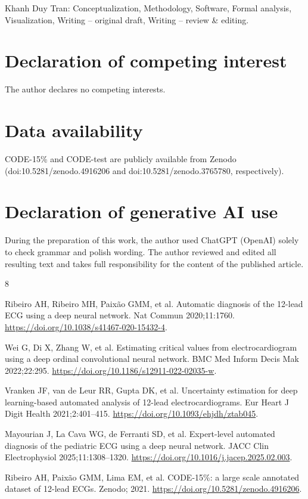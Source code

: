\documentclass[5p,times,twocolumn]{elsarticle}
\begin{document}
Khanh Duy Tran: Conceptualization, Methodology, Software, Formal analysis,
Visualization, Writing -- original draft, Writing -- review \& editing.

\section*{Declaration of competing interest}

The author declares no competing interests.

\section*{Data availability}

CODE-15\% and CODE-test are publicly available from Zenodo
(doi:10.5281/zenodo.4916206 and doi:10.5281/zenodo.3765780, respectively).

\section*{Declaration of generative AI use}

During the preparation of this work, the author used ChatGPT (OpenAI) 
solely to check grammar and polish wording. The author reviewed and 
edited all resulting text and takes full responsibility for the content of the published article.

\begin{thebibliography}{8}

Ribeiro AH, Ribeiro MH, Paix\~ao GMM, et al. Automatic diagnosis of the 12-lead
ECG using a deep neural network. Nat Commun 2020;11:1760.
\url{https://doi.org/10.1038/s41467-020-15432-4}.

Wei G, Di X, Zhang W, et al. Estimating critical values from electrocardiogram
using a deep ordinal convolutional neural network. BMC Med Inform Decis Mak
2022;22:295. \url{https://doi.org/10.1186/s12911-022-02035-w}.

Vranken JF, van de Leur RR, Gupta DK, et al. Uncertainty estimation for deep
learning-based automated analysis of 12-lead electrocardiograms. Eur Heart J
Digit Health 2021;2:401--415. \url{https://doi.org/10.1093/ehjdh/ztab045}.

Mayourian J, La Cava WG, de Ferranti SD, et al. Expert-level automated diagnosis
of the pediatric ECG using a deep neural network. JACC Clin Electrophysiol
2025;11:1308--1320. \url{https://doi.org/10.1016/j.jacep.2025.02.003}.

Ribeiro AH, Paix\~ao GMM, Lima EM, et al. CODE-15\%: a large scale annotated
dataset of 12-lead ECGs. Zenodo; 2021. \url{https://doi.org/10.5281/zenodo.4916206}.

\end{thebibliography}

\end{document}
